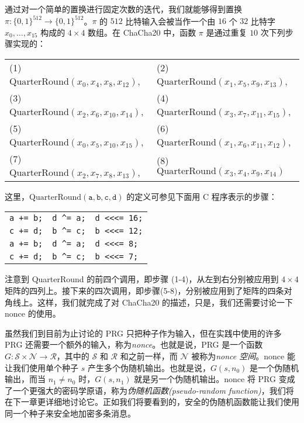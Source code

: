 \begin{snote}[实现细节。]
通过对一个简单的置换进行固定次数的迭代，我们就能够得到置换 $\pi:\{0,1\}^{512}\to\{0,1\}^{512}$。$\pi$ 的 $512$ 比特输入会被当作一个由 $16$ 个 $32$ 比特字 $x_0,\dots,x_{15}$ 构成的 $4\times4$ 数组。在 ChaCha20 中，函数 $\pi$ 是通过重复 $10$ 次下列步骤实现的：
\begin{center}
\begin{tabular}{ll}
 (1) $\mathrm{QuarterRound}(x_0,x_4,x_8,x_{12})$, & (2) $\mathrm{QuarterRound}(x_1,x_5,x_9,x_{13})$,\\ 
 (3) $\mathrm{QuarterRound}(x_2,x_6,x_{10},x_{14})$, & (4) $\mathrm{QuarterRound}(x_3,x_7,x_{11},x_{15})$,\\  
 (5) $\mathrm{QuarterRound}(x_0,x_5,x_{10},x_{15})$, & (6) $\mathrm{QuarterRound}(x_1,x_6,x_{11},x_{12})$,\\
 (7) $\mathrm{QuarterRound}(x_2,x_7,x_8,x_{13})$, & (8) $\mathrm{QuarterRound}(x_3,x_4,x_9,x_{14})$\\
\end{tabular}
\end{center}
这里，$\mathrm{QuarterRound}(\texttt{a},\texttt{b},\texttt{c},\texttt{d})$ 的定义可参见下面用 C 程序表示的步骤：
\begin{center}
\begin{tabular}{lll}
\texttt{a += b;} & \texttt{d \^{}=  a;} & \texttt{d <<<= 16;}\\
\texttt{c += d;} & \texttt{b \^{}=  c;} & \texttt{b <<<= 12;}\\
\texttt{a += b;} & \texttt{d \^{}=  a;} & \texttt{d <<<= 8;}\\
\texttt{c += d;} & \texttt{b \^{}=  c;} & \texttt{b <<<= 7;}
\end{tabular}
\end{center}
注意到 QuarterRound 的前四个调用，即步骤 (1-4)，从左到右分别被应用到 $4\times4$ 矩阵的四列上。接下来的四次调用，即步骤(5-8)，分别被应用到了矩阵的四条对角线上。这样，我们就完成了对 ChaCha20 的描述，只是，我们还需要讨论一下 nonce 的使用。
\end{snote}

\begin{snote}[使用nonce。]
虽然我们到目前为止讨论的 PRG 只把种子作为输入，但在实践中使用的许多 PRG 还需要一个额外的输入，称为\emph{nonce}。也就是说，PRG 是一个函数 $G:\mathcal{S}\times\mathcal{N}\to\mathcal{R}$，其中的 $\mathcal{S}$ 和 $\mathcal{R}$ 和之前一样，而 $\mathcal{N}$ 被称为\emph{nonce 空间}。nonce 能让我们使用单个种子 $s$ 产生多个伪随机输出。也就是说，$G(s,n_0)$ 是一个伪随机输出，而当 $n_1\neq n_0$ 时，$G(s,n_1)$ 就是另一个伪随机输出。nonce 将 PRG 变成了一个更强大的密码学原语，称为\emph{伪随机函数(pseudo-random function)}，我们将在下一章更详细地讨论它。正如我们将要看到的，安全的伪随机函数能让我们使用同一个种子来安全地加密多条消息。
\end{snote}